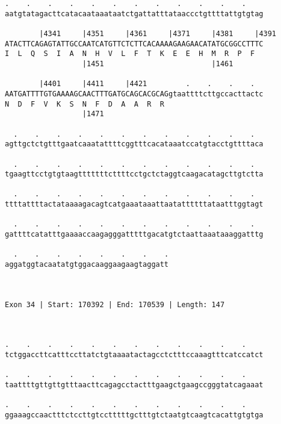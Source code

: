 \documentclass{article}
\begin{document}
\begin{Verbatim}
.    .    .    .    .    .    .    .    .    .    .    .    
aatgtatagacttcatacaataaataatctgattatttataaccctgttttattgtgtag
                                                            
        |4341     |4351     |4361     |4371     |4381     |4391
ATACTTCAGAGTATTGCCAATCATGTTCTCTTCACAAAAGAAGAACATATGCGGCCTTTC
I  L  Q  S  I  A  N  H  V  L  F  T  K  E  E  H  M  R  P  F  
                  |1451                         |1461       
  
        |4401     |4411     |4421         .    .    .    .  
AATGATTTTGTGAAAAGCAACTTTGATGCAGCACGCAGgtaattttcttgccacttactc
N  D  F  V  K  S  N  F  D  A  A  R  R                       
                  |1471                                     
  
  .    .    .    .    .    .    .    .    .    .    .    .  
agttgctctgtttgaatcaaatattttcggtttcacataaatccatgtacctgttttaca
                                                            
  .    .    .    .    .    .    .    .    .    .    .    .  
tgaagttcctgtgtaagtttttttcttttcctgctctaggtcaagacatagcttgtctta
                                                            
  .    .    .    .    .    .    .    .    .    .    .    .  
ttttattttactataaaagacagtcatgaaataaattaatattttttataatttggtagt
                                                            
  .    .    .    .    .    .    .    .    .    .    .    .  
gattttcatatttgaaaaccaagagggatttttgacatgtctaattaaataaaggatttg
                                                            
  .    .    .    .    .    .    .    .
aggatggtacaatatgtggacaaggaagaagtaggatt
                                      
                                      
 
Exon 34 | Start: 170392 | End: 170539 | Length: 147



.    .    .    .    .    .    .    .    .    .    .    .    
tctggaccttcatttccttatctgtaaaatactagcctctttccaaagtttcatccatct
                                                            
.    .    .    .    .    .    .    .    .    .    .    .    
taattttgttgttgtttaacttcagagcctactttgaagctgaagccgggtatcagaaat
                                                            
.    .    .    .    .    .    .    .    .    .    .    .    
ggaaagccaactttctccttgtcctttttgctttgtctaatgtcaagtcacattgtgtga
                                                            

\end{Verbatim}
\end{document}
